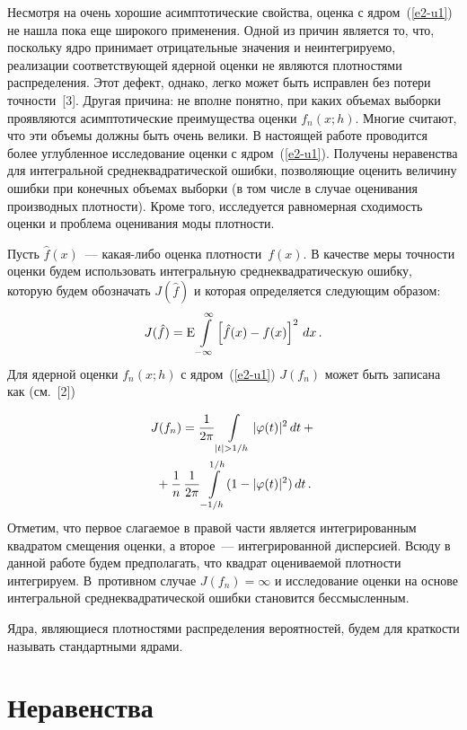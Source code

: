 \begin{multicols}{2}
Несмотря на очень хорошие асимптотические свойства, оценка с ядром~(\ref{e2-u1})
не нашла пока еще широкого применения. Одной из причин является то,
что, поскольку ядро принимает отрицательные значения и
неинтегрируемо, реализации соответствующей ядерной оценки не
являются плотностями распределения. Этот дефект, однако, легко может быть
исправлен без потери точности~[3]. Другая причина: не вполне понятно,
при каких объемах выборки проявляются асимптотические преимущества
оценки $f_n(x;h)$. Многие считают, что эти объемы должны быть очень велики.
В настоящей работе проводится более углубленное исследование оценки с ядром~(\ref{e2-u1}).
Получены неравенства для интегральной среднеквадратической ошибки,
позволяющие оценить величину ошибки при конечных объемах выборки
(в том числе в случае оценивания производных плотности).
Кроме того, исследуется равномерная сходимость оценки и
проблема оценивания моды плотности.

Пусть $\hat f(x)$~--- какая-либо оценка плотности~$f(x)$.
В качестве меры точности оценки будем использовать интегральную
среднеквадратическую ошибку, которую будем обозначать $J(\hat f)$ и
которая определяется следующим образом:
$$
J(\hat f)={\rm E}\int\limits_{-\infty}^\infty\left[\hat f(x)-f(x)\right]^2\,dx\,.
$$
Для ядерной оценки $f_n(x;h)$ с ядром~(\ref{e2-u1}) $J(f_n)$ может быть записана
как (см.~[2])

\noindent
\begin{multline}
J(f_n)=\fr{1}{2\pi}\int\limits_{|t|>1/h}|\varphi(t)|^2\,dt+{}\\
{}+
\fr{1}{n}\,\fr{1}{2\pi}
\int\limits_{-1/h}^{1/h}(1-|\varphi(t)|^2)\,dt\,.
\label{e3-u1}
\end{multline}
Отметим, что первое слагаемое в правой части является интегрированным
квадратом смещения оценки, а второе~--- интегрированной дисперсией.
Всюду в данной работе будем предполагать, что квадрат оцениваемой
плотности интегрируем. В~противном случае $J(f_n)=\infty$ и исследование
оценки на основе интегральной среднеквадратической ошибки становится бессмысленным.

Ядра, являющиеся плотностями распределения вероятностей, будем для
краткости называть стандартными ядрами.

\vspace*{-3pt}

\section{Неравенства}


\end{multicols}
